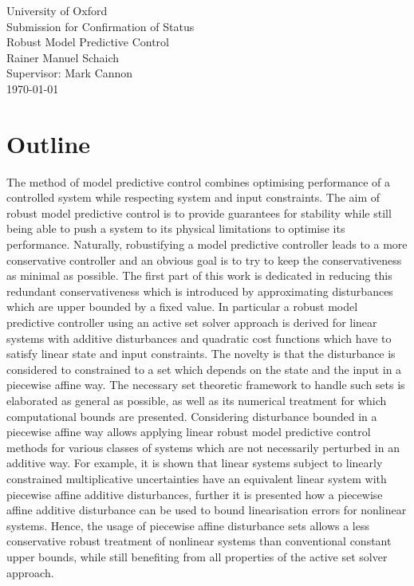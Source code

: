 \documentclass[a4paper,12pt]{scrartcl}
\begin{document}
\pagestyle{empty}
\begin{center}
{\Large{University of Oxford\\ \vspace{2em} Submission for Confirmation of Status\\ \vspace{4em}}}
{\Huge{Robust Model Predictive Control\\}}
{\Large{\vspace{3em} Rainer Manuel Schaich\\ \vspace{2em} Supervisor: Mark Cannon\\ \vspace{2em} \today}}
\end{center}
\pagebreak
\pagestyle{plain}
\section*{Outline}
\doublespacing

The method of model predictive control combines optimising performance of a controlled system while respecting 
system and input constraints.
%
The aim of robust model predictive control is to provide guarantees for stability while still being able to push
a system to its physical limitations to optimise its performance.
%
Naturally, robustifying a model predictive controller leads to a more conservative controller and an obvious goal is
to try to keep the conservativeness as minimal as possible.
%
The first part of this work is dedicated in reducing this redundant conservativeness which is introduced by approximating
disturbances which are upper bounded by a fixed value.
%
In particular a robust model predictive controller using an active set solver approach is derived for linear systems
with additive disturbances and quadratic cost functions which have to satisfy linear state and input constraints.
%
The novelty is that the disturbance is considered to constrained to a set which depends on the state and the input in
a piecewise affine way.
%
The necessary set theoretic framework to handle such sets is elaborated as general as possible, as well as its numerical
treatment for which computational bounds are presented.
%
Considering disturbance bounded in a piecewise affine way allows applying linear robust model predictive control
methods for various classes of systems which are not necessarily perturbed in an additive way.
%
For example, it is shown that linear systems subject to linearly constrained multiplicative uncertainties have an
equivalent linear system with piecewise affine additive disturbances, further it is presented how a piecewise affine 
additive disturbance can be used to bound linearisation errors for nonlinear systems.
%
Hence, the usage of piecewise affine disturbance sets allows a less conservative robust treatment of nonlinear systems
than conventional constant upper bounds, while still benefiting from all properties of the active set solver approach.
\end{document}
